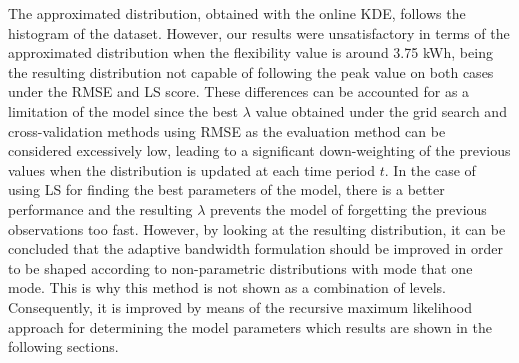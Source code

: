 The approximated distribution, obtained with the online KDE, follows the histogram of the dataset. However, our results were unsatisfactory in terms of the approximated distribution when the flexibility value is around 3.75 kWh, being the resulting distribution not capable of following the peak value on both cases under the RMSE and LS score. These differences can be accounted for as a limitation of the model since the best $\lambda$ value obtained under the grid search and cross-validation methods using RMSE as the evaluation method can be considered excessively low, leading to a significant down-weighting of the previous values when the distribution is updated at each time period $t$. In the case of using LS for finding the best parameters of the model, there is a better performance and the resulting $\lambda$ prevents the model of forgetting the previous observations too fast. However, by looking at the resulting distribution, it can be concluded that the adaptive bandwidth formulation should be improved in order to be shaped according to non-parametric distributions with mode that one mode. This is why this method is not shown as a combination of levels. Consequently, it is improved by means of the recursive maximum likelihood approach for determining the model parameters which results are shown in the following sections.  






